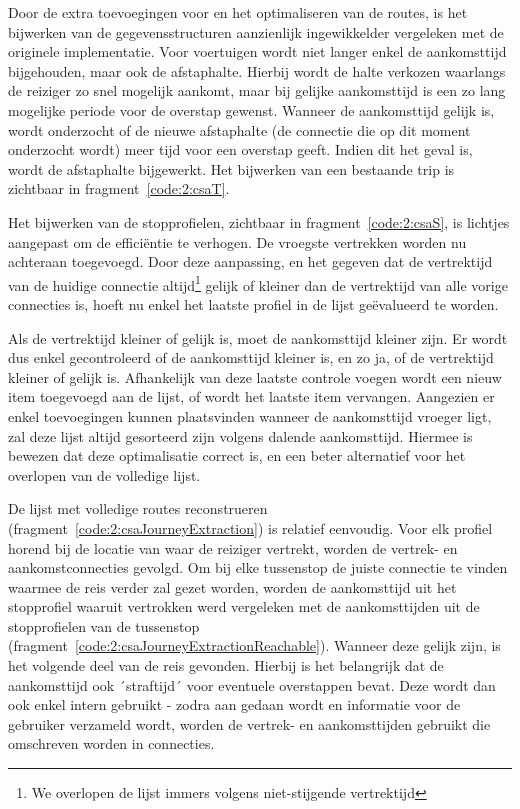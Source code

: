 Door de extra toevoegingen voor  en het optimaliseren van de routes, is het bijwerken van de gegevensstructuren aanzienlijk ingewikkelder vergeleken met de originele implementatie. Voor voertuigen wordt niet langer enkel de aankomsttijd bijgehouden, maar ook de afstaphalte. Hierbij wordt de halte verkozen waarlangs de reiziger zo snel mogelijk aankomt, maar bij gelijke aankomsttijd is een zo lang mogelijke periode voor de overstap gewenst. Wanneer de aankomsttijd gelijk is, wordt onderzocht of de nieuwe afstaphalte (de connectie die op dit moment onderzocht wordt) meer tijd voor een overstap geeft. Indien dit het geval is, wordt de afstaphalte bijgewerkt. Het bijwerken van een bestaande trip is zichtbaar in fragment~\ref{code:2:csaT}.


Het bijwerken van de stopprofielen, zichtbaar in fragment~\ref{code:2:csaS}, is lichtjes aangepast om de efficiëntie te verhogen. De vroegste vertrekken worden nu achteraan toegevoegd. Door deze aanpassing, en het gegeven dat de vertrektijd van de huidige connectie altijd\footnote{We overlopen de lijst immers volgens niet-stijgende vertrektijd} gelijk of kleiner dan de vertrektijd van alle vorige connecties is, hoeft nu enkel het laatste profiel in de lijst geëvalueerd te worden.

Als de vertrektijd kleiner of gelijk is, moet de aankomsttijd kleiner zijn. Er wordt dus enkel gecontroleerd of de aankomsttijd kleiner is, en zo ja, of de vertrektijd kleiner of gelijk is. Afhankelijk van deze laatste controle voegen wordt een nieuw item toegevoegd aan de lijst, of wordt het laatste item vervangen. Aangezien er enkel toevoegingen kunnen plaatsvinden wanneer de aankomsttijd vroeger ligt, zal deze lijst altijd gesorteerd zijn volgens dalende aankomsttijd. Hiermee is bewezen dat deze optimalisatie correct is, en een beter alternatief voor het overlopen van de volledige lijst.

De lijst met volledige routes reconstrueren (fragment~\ref{code:2:csaJourneyExtraction}) is relatief eenvoudig. Voor elk profiel horend bij de locatie van waar de reiziger vertrekt, worden de vertrek- en aankomstconnecties gevolgd. Om bij elke tussenstop de juiste connectie te vinden waarmee de reis verder zal gezet worden, worden de aankomsttijd uit het stopprofiel waaruit vertrokken werd vergeleken met de aankomsttijden uit de stopprofielen van de tussenstop (fragment~\ref{code:2:csaJourneyExtractionReachable}). Wanneer deze gelijk zijn, is het volgende deel van de reis gevonden. Hierbij is het belangrijk dat de aankomsttijd ook ´straftijd´ voor eventuele overstappen bevat. Deze wordt dan ook enkel intern gebruikt - zodra aan  gedaan wordt en informatie voor de gebruiker verzameld wordt, worden de vertrek- en aankomsttijden gebruikt die omschreven worden in connecties.

